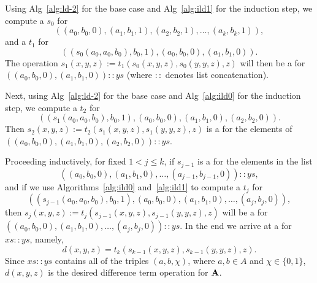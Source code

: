   Using Alg~\ref{alg:ld-2} for the base case
  and Alg~\ref{alg:ild1}
  for the induction step,
  we compute a \ldto $s_0$ for
  \begin{equation*}
  ((a_0, b_0, 0), (a_1, b_1, 1), (a_2, b_2, 1), \dots, (a_k, b_k, 1)),
  \end{equation*}
  and a \ldto $t_1$ for
  \begin{equation*}
  ((s_0(a_0, a_0, b_0), b_0, 1), (a_0, b_0, 0),(a_1, b_1, 0)).
  \end{equation*}
  The operation $s_1(x,y,z) := t_1(s_0(x,y,z), s_0(y,y,z), z)$ will then be
  a \ldto for
  $((a_0, b_0, 0), (a_1, b_1, 0)) :: ys$  (where $::$ denotes
  list concatenation).

  Next, using Alg~\ref{alg:ld-2} for the base case
  and Alg~\ref{alg:ild0} for the induction step,
  we compute a \ldto $t_2$ for
  \begin{equation*}
  ((s_1(a_0, a_0, b_0), b_0, 1), (a_0, b_0, 0),(a_1, b_1, 0),(a_2, b_2, 0)).
  \end{equation*}
  Then $s_2(x,y,z) := t_2(s_1(x,y,z), s_1(y,y,z), z)$ is a \ldto
  for the elements of
  $((a_0, b_0, 0), (a_1, b_1, 0), (a_2, b_2, 0)) :: ys$.

  Proceeding inductively, for fixed $1<j\leq k$,
  if $s_{j-1}$ is a \ldto
  for the elements in the list
  \begin{equation*}
  ((a_0, b_0, 0), (a_1, b_1, 0), \dots, (a_{j-1}, b_{j-1}, 0)) :: ys,
  \end{equation*}
  and if we use Algorithms~\ref{alg:ild0} and~\ref{alg:ild1}
  to compute a \ldto $t_j$ for
  \begin{equation*}
  ((s_{j-1}(a_0, a_0, b_0), b_0, 1), (a_0, b_0, 0),(a_1, b_1, 0),\dots,
  (a_j, b_j, 0)),
  \end{equation*}
  then $s_j(x,y,z) := t_j(s_{j-1}(x,y,z), s_{j-1}(y,y,z), z)$ will be a
  \ldto for
  $((a_0, b_0, 0), (a_1, b_1, 0), \dots, (a_j, b_j, 0)) :: ys$.
  In the end we arrive at a \ldto for $xs :: ys$, namely,
  \begin{equation*}
  d(x,y,z) = t_k(s_{k-1}(x,y,z), s_{k-1}(y,y,z), z).
  \end{equation*}
  Since $xs :: ys$ contains all of the triples $(a,b,\chi)$, where
  $a, b \in A$ and $\chi \in \{0,1\}$,
  $d(x,y,z)$ is the desired difference term operation for $\mathbf{A}$.







